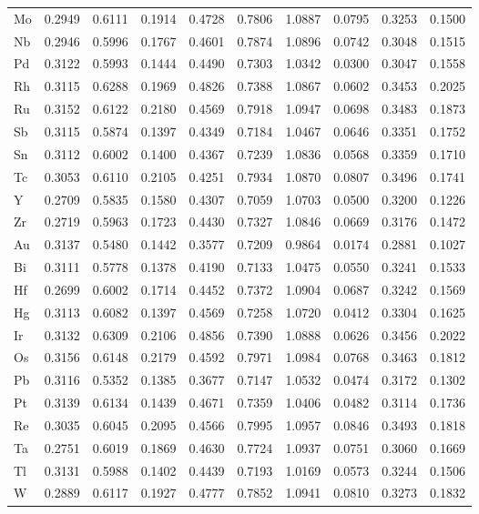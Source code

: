 \documentclass[a4paper, 12pt]{article}
\begin{document}
\begin{table}[htbp]
{\begin{tabular}{l *{9}{c}}
      Mo & 0.2949 & 0.6111 & 0.1914 & 0.4728 & 0.7806 & 1.0887 & 0.0795 & 0.3253 & 0.1500 \\
      Nb & 0.2946 & 0.5996 & 0.1767 & 0.4601 & 0.7874 & 1.0896 & 0.0742 & 0.3048 & 0.1515 \\
      Pd & 0.3122 & 0.5993 & 0.1444 & 0.4490 & 0.7303 & 1.0342 & 0.0300 & 0.3047 & 0.1558 \\
      Rh & 0.3115 & 0.6288 & 0.1969 & 0.4826 & 0.7388 & 1.0867 & 0.0602 & 0.3453 & 0.2025 \\
      Ru & 0.3152 & 0.6122 & 0.2180 & 0.4569 & 0.7918 & 1.0947 & 0.0698 & 0.3483 & 0.1873 \\
      Sb & 0.3115 & 0.5874 & 0.1397 & 0.4349 & 0.7184 & 1.0467 & 0.0646 & 0.3351 & 0.1752 \\
      Sn & 0.3112 & 0.6002 & 0.1400 & 0.4367 & 0.7239 & 1.0836 & 0.0568 & 0.3359 & 0.1710 \\
      Tc & 0.3053 & 0.6110 & 0.2105 & 0.4251 & 0.7934 & 1.0870 & 0.0807 & 0.3496 & 0.1741 \\
      Y  & 0.2709 & 0.5835 & 0.1580 & 0.4307 & 0.7059 & 1.0703 & 0.0500 & 0.3200 & 0.1226 \\
      Zr & 0.2719 & 0.5963 & 0.1723 & 0.4430 & 0.7327 & 1.0846 & 0.0669 & 0.3176 & 0.1472 \\
      Au & 0.3137 & 0.5480 & 0.1442 & 0.3577 & 0.7209 & 0.9864 & 0.0174 & 0.2881 & 0.1027 \\
      Bi & 0.3111 & 0.5778 & 0.1378 & 0.4190 & 0.7133 & 1.0475 & 0.0550 & 0.3241 & 0.1533 \\
      Hf & 0.2699 & 0.6002 & 0.1714 & 0.4452 & 0.7372 & 1.0904 & 0.0687 & 0.3242 & 0.1569 \\
      Hg & 0.3113 & 0.6082 & 0.1397 & 0.4569 & 0.7258 & 1.0720 & 0.0412 & 0.3304 & 0.1625 \\
      Ir & 0.3132 & 0.6309 & 0.2106 & 0.4856 & 0.7390 & 1.0888 & 0.0626 & 0.3456 & 0.2022 \\
      Os & 0.3156 & 0.6148 & 0.2179 & 0.4592 & 0.7971 & 1.0984 & 0.0768 & 0.3463 & 0.1812 \\
      Pb & 0.3116 & 0.5352 & 0.1385 & 0.3677 & 0.7147 & 1.0532 & 0.0474 & 0.3172 & 0.1302 \\
      Pt & 0.3139 & 0.6134 & 0.1439 & 0.4671 & 0.7359 & 1.0406 & 0.0482 & 0.3114 & 0.1736 \\
      Re & 0.3035 & 0.6045 & 0.2095 & 0.4566 & 0.7995 & 1.0957 & 0.0846 & 0.3493 & 0.1818 \\
      Ta & 0.2751 & 0.6019 & 0.1869 & 0.4630 & 0.7724 & 1.0937 & 0.0751 & 0.3060 & 0.1669 \\
      Tl & 0.3131 & 0.5988 & 0.1402 & 0.4439 & 0.7193 & 1.0169 & 0.0573 & 0.3244 & 0.1506 \\
      W  & 0.2889 & 0.6117 & 0.1927 & 0.4777 & 0.7852 & 1.0941 & 0.0810 & 0.3273 & 0.1832 \\
      \bottomrule
    \end{tabular}
  }
\end{table}
\end{document}
